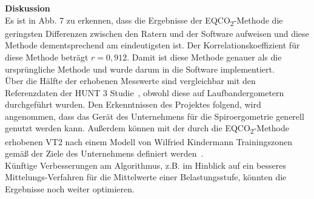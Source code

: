 \textbf{\Large Diskussion}\\

Es ist in Abb. 7 zu erkennen, dass die Ergebnisse der EQCO\textsubscript{2}-Methode die geringsten Differenzen zwischen den Ratern und der Software aufweisen und diese Methode dementsprechend am eindeutigsten ist. Der Korrelationskoeffizient für diese Methode beträgt $r = 0,912$. Damit ist diese Methode genauer als die ursprüngliche Methode und wurde darum in die Software implementiert.\\
Über die Hälfte der erhobenen Messwerte sind vergleichbar mit den Referenzdaten der HUNT 3 Studie~\cite{Loe.2014}, obwohl diese auf Laufbandergometern durchgeführt wurden. Den Erkenntnissen des Projektes folgend, wird angenommen, dass das Gerät des Unternehmens für die Spiroergometrie generell genutzt werden kann. Außerdem können mit der durch die EQCO\textsubscript{2}-Methode erhobenen VT2 nach einem Modell von Wilfried Kindermann Trainingszonen gemäß der Ziele des Unternehmens definiert werden~\cite{Kindermann.2004}.\\
Künftige Verbesserungen am Algorithmus, z.B. im Hinblick auf ein besseres Mittelungs-Verfahren für die Mittelwerte einer Belastungsstufe, könnten die Ergebnisse noch weiter optimieren.